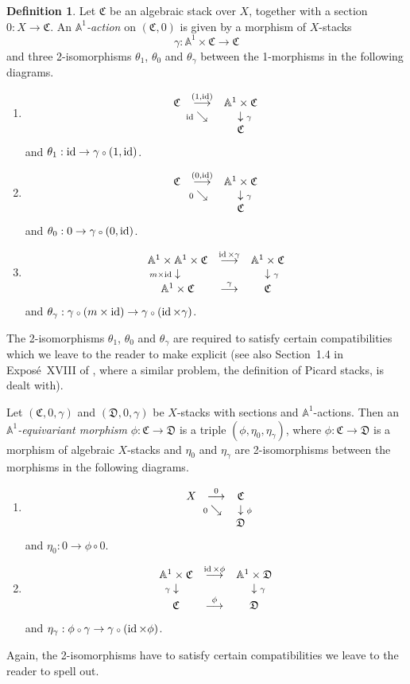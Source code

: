 \documentclass[11pt]{article}
\theoremstyle{plain}
\theoremstyle{definition}
\newtheorem{defnp}[prop]{Definition}
\newenvironment{defn}{\begin{defnp}\normalfont}{\end{defnp}}
\newcommand{\DD}{{\mathfrak{D}}}
\newcommand{\CC}{{\mathfrak{C}}}
\newcommand{\aaa}{{\mathbb{A}}}
\newcommand{\id}{\mathop{\rm id}}
\newcommand{\comp}{\mathbin{{\scriptstyle\circ}}}
\newcommand{\ldiag}[1]
       {\makebox[0cm]{\({\scriptstyle#1}\downarrow\phantom{\scriptstyle#1}\)}}
\newcommand{\rdiag}[1]
       {\makebox[0cm]{\(\phantom{\scriptstyle#1}\downarrow{\scriptstyle#1}\)}}
\newcommand{\sediag}[1]
       {\makebox[0cm]{\({\scriptstyle#1}\searrow\phantom{\scriptstyle#1}\)}}
\newcommand{\comdia}[9]{
\begin{array}{ccc}
#1 & \stackrel{#2}{\longrightarrow} & #3 \\
\ldiag{#4} & #5 & \rdiag{#6} \\
#7 & \stackrel{#8}{\longrightarrow} & #9
\end{array}}
\newcommand{\comtri}[6]{
\begin{array}{ccc}
#1 & \stackrel{#2}{\longrightarrow} & #3         \\
   & \sediag{#4}                    & \rdiag{#5} \\
   &                                & #6
\end{array}}
\theoremstyle{plain}
\theoremstyle{definition}
\theoremstyle{remark}
\begin{document}
\begin{defn}
Let \(\CC\) be an algebraic stack over \(X\), together with a section
\(0:X\to\CC\). An {\em \(\aaa^1\)-action }on \((\CC,0)\) is given by a
morphism of \(X\)-stacks
\[
\gamma:\aaa^1\times\CC\longrightarrow\CC
\]
and
three 2-isomorphisms \(\theta_1\), \(\theta_0\) and \(\theta_{\gamma}\)
between the 1-morphisms in the following diagrams.
\begin{enumerate}
\item
\[
\comtri{\CC}{(1,\id)}{\aaa^1\times \CC}{\id}{\gamma}{\CC}
\]
and \(\theta_1:\id\to\gamma\comp(1,\id)\).
\item
\[
\comtri{\CC}{(0,\id)}{\aaa^1\times \CC}{0}{\gamma}{\CC}
\]
and \(\theta_0:0\to\gamma\comp(0,\id)\).
\item
\[
\comdia{\aaa^1\times\aaa^1\times \CC} {\id\times\gamma}
{\aaa^1\times \CC} {m\times\id}{}{\gamma} {\aaa^1\times \CC}{\gamma}{\CC}
\]
and
\(\theta_{\gamma}:\gamma\comp(m\times\id)\to\gamma\comp(\id\times\gamma)\).
\end{enumerate}
The 2-isomorphisms \(\theta_1\), \(\theta_0\) and \(\theta_{\gamma}\) are
required to satisfy certain compatibilities which we leave to the
reader to make explicit (see also Section~1.4 in Expos\'e~XVIII of
\cite{sga4}, where a similar problem, the definition of Picard stacks,
is dealt with).

Let \((\CC,0,\gamma)\) and \((\DD,0,\gamma)\) be \(X\)-stacks with sections
and \(\aaa^1\)-actions. Then an {\em \(\aaa^1\)-equivariant morphism }
\(\phi:\CC\to\DD\) is a triple \((\phi,\eta_0,\eta_{\gamma})\), where
\(\phi:\CC\to\DD\) is a morphism of algebraic \(X\)-stacks and \(\eta_0\)
and \(\eta_{\gamma}\) are 2-isomorphisms between the morphisms in the
following diagrams.
\begin{enumerate}
\item\begin{equation}\label{na1}
\comtri{X}{0}{\CC}{0}{\phi}{\DD}
\end{equation}
and \(\eta_0:0\to\phi\comp 0\).
\item \begin{equation}\label{na2}
\comdia{\aaa^1\times\CC}{\id\times\phi}{\aaa^1\times\DD}
{\gamma}{}{\gamma} {\CC}{\phi}{\DD}
\end{equation}
and \(\eta_{\gamma}:\phi\comp\gamma\to\gamma\comp(\id\times\phi)\).
\end{enumerate}
Again, the 2-isomorphisms have to satisfy certain compatibilities we
leave to the reader to spell out.


\end{defn}
\end{document}
